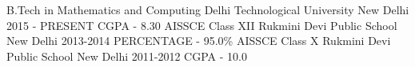 \begin{cventries}
  \cventry
    {B.Tech in Mathematics and Computing}
    {Delhi Technological University}
    {New Delhi}
    {2015 - PRESENT}
    {
    CGPA - 8.30
    }
  \cventry
  {AISSCE Class XII}
  {Rukmini Devi Public School}
  {New Delhi}
  {2013-2014}
  {
  PERCENTAGE - 95.0\%
  }
  \cventry
  {AISSCE Class X}
  {Rukmini Devi Public School}
  {New Delhi}
  {2011-2012}
  {
  CGPA - 10.0
  }
\end{cventries}
